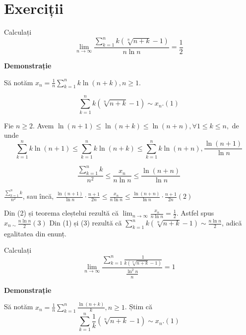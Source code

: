 \documentclass[a4paper,12pt,oneside]{report}
\begin{document}
\section{Exerciții}

Calculați \begin{displaymath}
  \lim_{n \to \infty }\frac{\sum_{k=1}^{n}k\left ( \sqrt[n]{n+k} -1\right )}{n\ln n } = \frac{1}{2}
\end{displaymath}


\textbf{Demonstrație} 

Să notăm \(x_{n} = \frac{1}{n}\sum_{k=1}^{n} k \ln \left ( n+k \right ), n \geq 1\). 

\begin{displaymath}
  \sum_{k=1}^{n}k\left ( \sqrt[n]{n+k}-1 \right )\sim x_{n}. (1)
\end{displaymath}

Fie \(n\geq 2\). Avem \(\ln \left ( n+1 \right )\leq \ln \left ( n+k \right )\leq \ln \left ( n+n \right ), \forall 1\leq k\leq n,\) de unde 
\begin{displaymath}
  \sum_{k=1}^{n} k \ln \left ( n+1 \right )\leq \sum_{k=1}^{n}k \ln \left ( n+k \right )\leq \sum_{k=1}^{n} k \ln \left ( n+n \right ), \frac{\ln \left ( n+1 \right )}{\ln n }
\end{displaymath}

\begin{displaymath}
  \frac{\sum_{k=1}^{n}k}{n^{2}}\leq \frac{x_{n}}{n\ln n}\leq \frac{\ln \left ( n+n \right )}{\ln n }
\end{displaymath}

\(\frac{\sum_{k=1}^{n}k}{n^{2}}\), sau încă, 
\(\frac{\ln \left ( n+1 \right )}{\ln n} \cdot \frac{n+1}{2n}\leq \frac{x_{n}}{n\ln n }\leq \frac{\ln \left ( n+n \right )}{\ln n }\cdot \frac{n+1}{2n} (2)\)

Din (2) și teorema cleștelui rezultă că \(\lim_{n \to \infty }\frac{x_{n}}{n\ln n } = \frac{1}{2}\). Astfel spus \(x_{n\sim }\frac{n\ln n }{2} (3)\)
Din (1) și (3) rezultă că \(\sum_{k=1}^{n}k\left ( \sqrt[n]{n+k}-1 \right )\sim \frac{n\ln n }{2}\), adică egalitatea din enunț. 


Calculați 
\begin{displaymath}
  \lim_{n \to \infty }\frac{\sum_{k=1}^{n}\frac{1}{k\left ( \sqrt[n]{n+k}-1 \right )}}{\frac{\ln^{2}n}{n}} = 1
\end{displaymath}

\textbf{Demonstrație} 

Să notăm \(x_{n}= \frac{1}{n}\sum_{k=1}^{n}\frac{\ln\left ( n+k \right )}{k}, n\geq 1\). 
Știm că 
\begin{displaymath}
  \sum_{k=1}^{n}\frac{1}{k}\left ( \sqrt[n]{n+k}-1 \right )\sim x_{n}. (1)
\end{displaymath}
\end{document}
